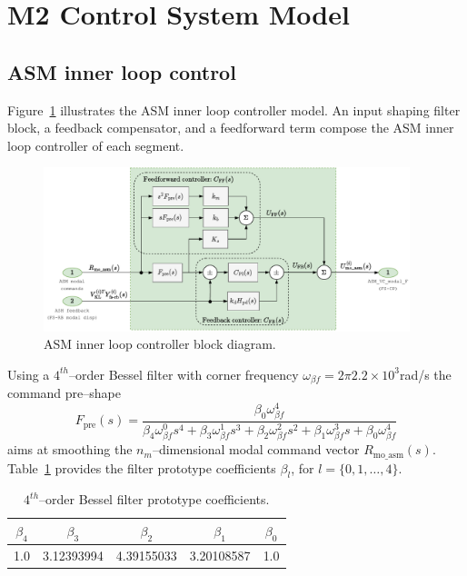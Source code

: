 \documentclass{gmto}
\begin{document}

\printbibliography

\appendix

\newpage

\section{M2 Control System Model}
\label{sec:m2_control}

\subsection{ASM inner loop control}
\label{sec:asm-ctrl}

Figure~\ref{fig:modal_asm_loop} illustrates the ASM inner loop controller model. An input shaping filter block, a feedback compensator, and a feedforward term compose the ASM inner loop controller of each segment.  %
%
\begin{figure}[!hbt]
  \centering
  \includegraphics[width=0.95\textwidth]{asm_controller.pdf}
  \caption{ASM inner loop controller block diagram.}
  \label{fig:modal_asm_loop}
\end{figure}

Using a $4^{th}$--order Bessel filter with corner frequency $\omega_{\beta f}=2 \pi 2.2 \times 10^3$\si{rad/s} the command pre--shape
\begin{equation}
  \label{eq:4thBessel}
  F_\text{pre}(s) = 
    \frac{\beta_0 \omega_{\beta f}^4}{\beta_4 \omega_{\beta f}^0 s^4 + \beta_3 \omega_{\beta f}^1 s^3 + \beta_2 \omega_{\beta f}^2 s^2 + \beta_1 \omega_{\beta f}^3 s + \beta_0 \omega_{\beta f}^4}    
\end{equation}
aims at smoothing the $n_m$--dimensional modal command vector $R_\text{mo\_asm}(s)$. Table~\ref*{tab:bessel_f_prototype} provides the filter prototype coefficients $\beta_l$, for $l=\{0,1,\dots,4\}$.
%
\begin{table}[!htb]
  \centering
  \caption{$4^{th}$--order Bessel filter prototype coefficients.}
  \label{tab:bessel_f_prototype}
  \begin{tabular}{|c|c|c|c|c|}
  \hline
  $\beta_4$ & $\beta_3$ & $\beta_2$ & $\beta_1$ & $\beta_0$ \\
  \hline
  1.0 & 3.12393994 & 4.39155033 & 3.20108587 & 1.0\\
  \hline
  \end{tabular}
\end{table}
\end{document}
